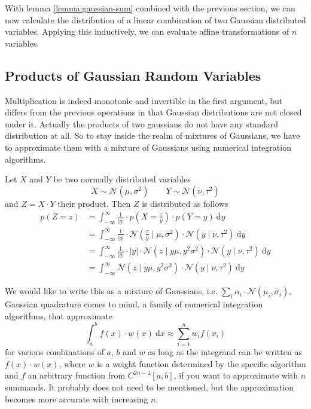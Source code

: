 \documentclass[11pt,a4paper]{book}
\begin{document}
With lemma \ref{lemma:gaussian-sum} combined with the previous section, we can
now calculate the distribution of a linear combination of two Gaussian
distributed variables. Applying this inductively, we can evaluate affine
transformations of $n$ variables.

\subsection{Products of Gaussian Random Variables}

Multiplication is indeed monotonic and invertible in the first argument, but
differs from the previous operations in that Gaussian distributions are not
closed under it. Actually the products of two gaussians do not have any standard
distribution at all. So to stay inside the realm of mixtures of Gaussians, we
have to approximate them with a mixture of Gaussians using numerical integration
algorithms.

Let $X$ and $Y$ be two normally distributed variables
\begin{equation*}
  X \sim \mathcal{N}(\mu, \sigma^{2}) \qquad Y \sim \mathcal{N}(\nu, \tau^{2})
\end{equation*}
and $Z = X \cdot Y$ their product. Then $Z$ is distributed as follows
\begin{align*}
  p(Z = z) & = \int_{-\infty}^{\infty} \frac{1}{|y|} \cdot p\left(X = \frac{z}{y}\right) \cdot p(Y = y)~\mathrm{d}y\\
           & = \int_{-\infty}^{\infty} \frac{1}{|y|} \cdot \mathcal{N}\left( \frac{z}{y} \mid \mu, \sigma^{2} \right) \cdot \mathcal{N}(y \mid \nu, \tau^{2})~\mathrm{d}y\\
           & = \int_{-\infty}^{\infty} \frac{1}{|y|} \cdot |y| \cdot \mathcal{N}\left( z \mid y\mu, y^{2}\sigma^{2} \right) \cdot \mathcal{N}(y \mid \nu, \tau^{2})~\mathrm{d}y\\
           & = \int_{-\infty}^{\infty} \mathcal{N}\left( z \mid y\mu, y^{2}\sigma^{2} \right) \cdot \mathcal{N}(y \mid \nu, \tau^{2})~\mathrm{d}y
\end{align*}

We would like to write this as a mixture of Gaussians, i.e.
$\sum_{i} \alpha_{i} \cdot \mathcal{N}(\mu_{i}, \sigma_{i})$. Gaussian
quadrature comes to mind, a family of numerical integration algorithms, that
approximate
\begin{equation*}
  \int_{a}^{b} f(x) \cdot w(x)~\mathrm{d}x \approx \sum_{i = 1}^{n} w_{i} f(x_{i})
\end{equation*}
for various combinations of $a$, $b$ and $w$ as long as the integrand can be
written as $f(x) \cdot w(x)$, where $w$ is a weight function determined by the
specific algorithm and $f$ an arbitrary function from $C^{2n - 1}[a, b]$, if you
want to approximate with $n$ summands. It probably does not need to be
mentioned, but the approximation becomes more accurate with increasing $n$.
\end{document}
